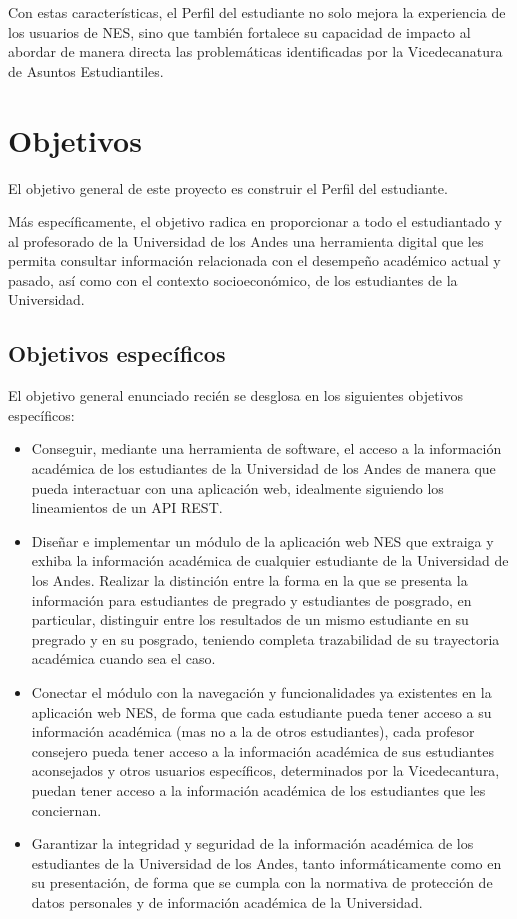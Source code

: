 Con estas características, el Perfil del estudiante no solo mejora la experiencia de los usuarios de \gls{NES}, sino que también fortalece su capacidad de impacto al abordar de manera directa las problemáticas identificadas por la Vicedecanatura de Asuntos Estudiantiles.

\section{Objetivos}

El objetivo general de este proyecto es construir el Perfil del estudiante.

Más específicamente, el objetivo radica en proporcionar a todo el estudiantado y al profesorado de la Universidad de los Andes una herramienta digital que les permita consultar información relacionada con el desempeño académico actual y pasado, así como con el contexto socioeconómico, de los estudiantes de la Universidad.

\subsection{Objetivos específicos}

El objetivo general enunciado recién se desglosa en los siguientes objetivos específicos:
\begin{itemize}
	\item Conseguir, mediante una herramienta de software, el acceso a la información académica de los estudiantes de la Universidad de los Andes de manera que pueda interactuar con una aplicación web, idealmente siguiendo los lineamientos de un \gls{API REST}.
	\item Diseñar e implementar un módulo de la aplicación web \gls{NES} que extraiga y exhiba la información académica de cualquier estudiante de la Universidad de los Andes. Realizar la distinción entre la forma en la que se presenta la información para estudiantes de pregrado y estudiantes de posgrado, en particular, distinguir entre los resultados de un mismo estudiante en su pregrado y en su posgrado, teniendo completa trazabilidad de su trayectoria académica cuando sea el caso.
	\item Conectar el módulo con la navegación y funcionalidades ya existentes en la aplicación web \gls{NES}, de forma que cada estudiante pueda tener acceso a su información académica (mas no a la de otros estudiantes), cada profesor consejero pueda tener acceso a la información académica de sus estudiantes aconsejados y otros usuarios específicos, determinados por la Vicedecantura, puedan tener acceso a la información académica de los estudiantes que les conciernan.
	\item Garantizar la integridad y seguridad de la información académica de los estudiantes de la Universidad de los Andes, tanto informáticamente como en su presentación, de forma que se cumpla con la normativa de protección de datos personales y de información académica de la Universidad.
\end{itemize}

